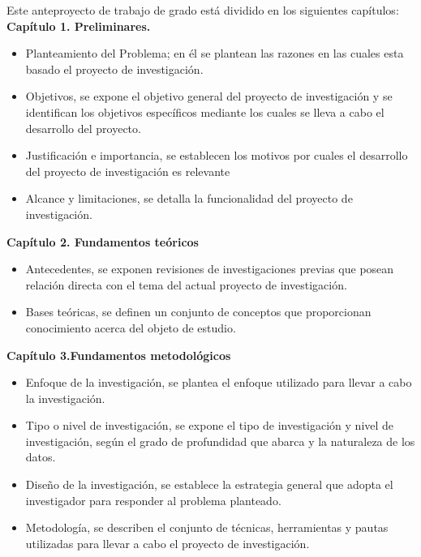 Este anteproyecto de trabajo de grado está dividido en los siguientes capítulos:\\

\textbf{Capítulo 1. Preliminares. }
\begin{itemize}
\item {Planteamiento del Problema; en él se plantean las razones en las cuales esta basado el proyecto de investigación.}
\item {Objetivos, se expone el objetivo general del proyecto de investigación y se identifican los objetivos específicos mediante los cuales se lleva a cabo el desarrollo del proyecto.}
\item {Justificación e importancia, se establecen los motivos por cuales el desarrollo del proyecto de investigación es relevante}
\item {Alcance y limitaciones, se detalla la funcionalidad del proyecto de investigación.}
\end{itemize}
\textbf{Capítulo 2. Fundamentos teóricos}
\begin{itemize}
\item {Antecedentes, se exponen revisiones de investigaciones previas que posean relación directa con el tema del actual proyecto de investigación.}
\item {Bases teóricas, se definen un conjunto de conceptos que proporcionan conocimiento acerca del objeto de estudio.}
\end{itemize}
\textbf{Capítulo 3.Fundamentos metodológicos}
\begin{itemize}
\item {Enfoque de la investigación, se plantea el enfoque utilizado para llevar a cabo la investigación.}
\item {Tipo o nivel de investigación, se expone el tipo de investigación y nivel de investigación, según el grado de profundidad que abarca y la naturaleza de los datos.}
\item {Diseño de la investigación, se establece la estrategia general que adopta el investigador para responder al problema planteado.}
\item {Metodología, se describen el conjunto de técnicas, herramientas y pautas utilizadas para llevar a cabo el proyecto de investigación.}
\end{itemize}